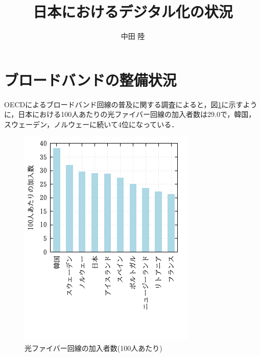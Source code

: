 \documentclass[a4paper,11pt,dvipdfmx]{ujarticle}
\title{日本におけるデジタル化の状況}
\author{中田 陸}
\begin{document}
\maketitle %

\section{ブロードバンドの整備状況}

OECDによるブロードバンド回線の普及に関する調査\cite{oecd}によると，図\ref{fig:fig1}に示すように，日本における100人あたりの光ファイバー回線の加入者数は29.0で，韓国，スウェーデン，ノルウェーに続いて4位になっている．

\begin{figure}[htbp]
    \centering
    \includegraphics{fig.png}
    \caption{光ファイバー回線の加入者数(100人あたり)}\label{fig:fig1}
\end{figure}
\end{document}
